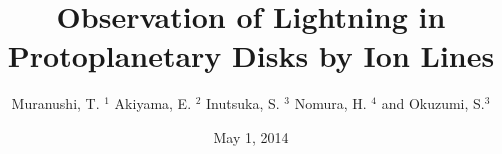 \documentclass[pdftex]{beamer}
\newtheorem{thm}{Theorem}[section]
\theoremstyle{example}
\newtheorem{exam}[thm]{Example}
\begin{document}
\title[PPD Lightning]{Observation of Lightning in Protoplanetary Disks by Ion Lines} 
\author[Muranushi et. al.]{
Muranushi, T. ${}^1$
Akiyama, E. ${}^2$
Inutsuka, S. ${}^3$
Nomura, H. ${}^4$
and Okuzumi, S.${}^3$}         
\date{May 1, 2014}



\begin{frame}             
\titlepage                
\end{frame}

\begin{frame}             
\tableofcontents
\end{frame}

% 
% 
% 
% 
% 
% 
% 
\end{document}

